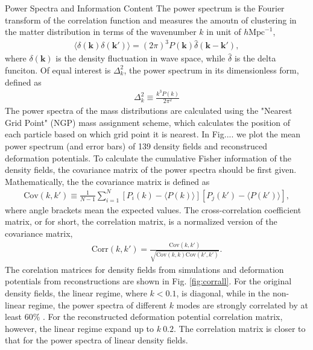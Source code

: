 \begin{section}{Power Spectra and Information Content}
  \label{sec:fisherinfo}
    The power spectrum is the Fourier transform of the correlation function and measures the amoutn of clustering in the matter distribution in terms of the wavenumber $k$ in unit of $h \mathrm{Mpc}^{-1}$,
\begin{align}
    \langle \delta \left( \bm{k} \right) \delta \left( \bm{k'}\right) \rangle =\left( 2\pi \right) ^3 P \left( \bm{k} \right) \hat{\delta} \left( \bm{k}-\bm{k'} \right),
\end{align}
where $\delta \left( \bm{k} \right)$ is the density fluctuation in wave space, while $\hat{\delta}$ is the delta funciton. Of equal interest is $\Delta ^2_k$, the power spectrum in its dimensionless form, defined as
\begin{align}
    \Delta ^2_k \equiv \frac{k^3 P \left( k \right)}{2\pi ^2}
\end{align}
    The power spectra of the mass distributions are calculated using the "Nearest Grid Point" (NGP) mass assignment scheme, which calculates the position of each particle based on which grid point it is nearest. In Fig.... we plot the mean power spectrum (and error bars) of 139 density fields and reconstruced deformation potentials.
    To calculate the cumulative Fisher information of the density fields, the covariance matrix of the power spectra should be first given. Mathematically, the the covariance matrix is defined as
\begin{align}
    \mathrm{Cov}\left(k,k'\right)\equiv \frac{1}{N-1}\sum_{i=1}^{N}\left[ P_i \left( k \right) - \langle P \left( k \right) \rangle \right]\left[ P_j \left( k' \right) - \langle P \left( k' \right)\rangle \right],
\end{align}
where angle brackets mean the expected values. 
    The cross-correlation coefficient matrix, or for short, the correlation matrix, is a normalized version of the covariance matrix,
\begin{align}
    \mathrm{Corr}\left(k,k'\right)=\frac{\mathrm{Cov}\left(k,k'\right)}{\sqrt{\mathrm{Cov}\left(k,k\right)\mathrm{Cov}\left(k',k'\right)}}.
\end{align}
The corelation matrices for density fields from simulations and deformation potentials from reconstructions are shown in Fig. \ref{fig:corrall}. For the original density fields, the linear regime, where $k<0.1$, is diagonal, while in the non-linear regime, the power spectra of different $k$ modes are strongly correlated by at least $60\%$ . For the reconstructed deformation potential correlation matrix, however, the linear regime expand up to $k~0.2$. The correlation matrix is closer to that for the power spectra of linear density fields.

\end{section}
